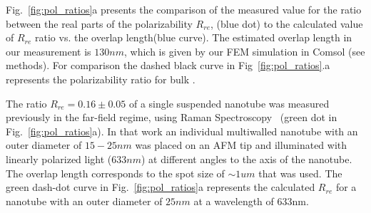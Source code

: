 \documentclass[journal=jacsat,manuscript=article]{achemso}
\begin{document}
Fig.~\ref{fig:pol_ratios}a presents the comparison of the measured value for the ratio between the real parts of the polarizability $R_{re}$, (blue dot) to the calculated value of $R_{re}$ ratio vs. the overlap length(blue curve). The estimated overlap length in our measurement is $130nm$, which is given by our FEM simulation in Comsol (see methods).
For comparison the dashed black curve in Fig~\ref{fig:pol_ratios}.a represents the polarizability ratio for bulk .

The ratio $R_{re}=0.16\pm0.05$ of a single suspended nanotube was measured previously in the far-field regime, using Raman Spectroscopy~\cite{tenne2005orientation} (green dot in Fig.~\ref{fig:pol_ratios}a). In that work an individual multiwalled  nanotube with an outer diameter of $15-25nm$ was placed on an AFM tip and illuminated with linearly polarized light ($633nm$) at different angles to the axis of the nanotube. The overlap length corresponds to the spot size of $\sim1um$ that was used.
The green dash-dot curve in Fig.~\ref{fig:pol_ratios}a represents the calculated $R_{re}$ for a nanotube with an outer diameter of $25nm$ at a wavelength of $633$nm.
\end{document}
